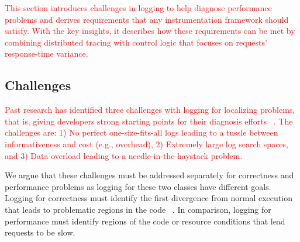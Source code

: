 \textcolor{red}{This section introduces challenges in logging to help diagnose performance problems
and derives requirements that any instrumentation framework should satisfy. 
With the key insights, it describes how these requirements can be met
by combining distributed tracing with control logic that focuses on requests' response-time variance.}


\subsection{Challenges}
\textcolor{red}{
Past research has identified three challenges with logging for localizing problems, that is, giving developers strong starting points for their diagnosis efforts ~\cite{Kiciman2005a}. 
The challenges are: 
1) No perfect one-size-fits-all logs leading to a tussle between informativeness and cost (e.g., overhead), 
2) Extremely large log search spaces, and
3) Data overload leading to a needle-in-the-haystack problem.
}

We argue that these challenges must be addressed
separately for correctness and performance problems as logging for these two classes have different goals.
Logging for correctness must identify the first divergence from normal execution that
leads to problematic regions in the code ~\cite{ArumugaNainar:2010fx,
Yuan:2012eh, Yuan:2010ww, Zuo:2016et}. 
In comparison, logging for performance must identify regions of the code or resource conditions that lead requests to be slow.



